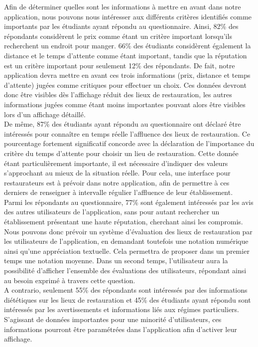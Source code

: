 Afin de déterminer quelles sont les informations à mettre en avant dans notre application, nous pouvons nous intéresser aux différents critères identifiés comme importants par les étudiants ayant répondu au questionnaire. Ainsi, 82\% des répondants considèrent le prix comme étant un critère important lorsqu'ils recherchent un endroit pour manger. 66\% des étudiants considèrent également la distance et le temps d'attente comme étant important, tandis que la réputation est un critère important pour seulement 12\% des répondants. De fait, notre application devra mettre en avant ces trois informations (prix, distance et temps d'attente) jugées comme critiques pour effectuer un choix. Ces données devront donc être visibles dès l'affichage réduit des lieux de restauration, les autres informations jugées comme étant moins importantes pouvant alors être visibles lors d’un affichage détaillé. \\

De même, 87\% des étudiants ayant répondu au questionnaire ont déclaré être intéressés pour connaître en temps réelle l'affluence des lieux de restauration. Ce pourcentage fortement significatif concorde avec la déclaration de l'importance du critère du temps d'attente pour choisir un lieu de restauration. Cette donnée étant particulièrement importante, il est nécessaire d'indiquer des valeurs s'approchant au mieux de la situation réelle. Pour cela, une interface pour restaurateurs est à prévoir dans notre application, afin de permettre à ces derniers de renseigner à intervalle régulier l’affluence de leur établissement. \\

Parmi les répondants au questionnaire, 77\% sont également intéressés par les avis des autres utilisateurs de l'application, sans pour autant rechercher un établissement présentant une haute réputation, cherchant ainsi les compromis. Nous pouvons donc prévoir un système d’évaluation des lieux de restauration par les utilisateurs de l'application, en demandant toutefois une notation numérique ainsi qu’une appréciation textuelle. Cela permettra de proposer dans un premier temps une notation moyenne. Dans un second temps, l'utilisateur aura la possibilité d'afficher l’ensemble des évaluations des utilisateurs, répondant ainsi au besoin exprimé à travers cette question. \\

A contrario, seulement 55\% des répondants sont intéressés par des informations diététiques sur les lieux de restauration et 45\% des étudiants ayant répondu sont intéressés par les avertissements et informations liés aux régimes particuliers. S'agissant de données importantes pour une minorité d'utilisateurs, ces informations pourront être paramétrées dans l'application afin d'activer leur affichage. \\

